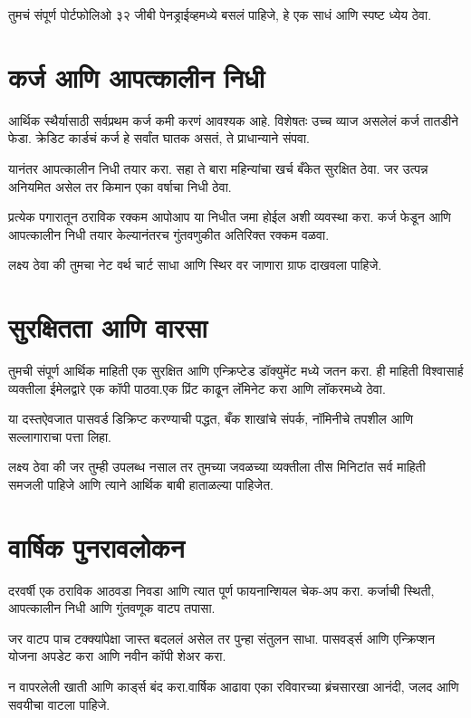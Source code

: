 तुमचं संपूर्ण पोर्टफोलिओ ३२ जीबी पेनड्राईव्हमध्ये बसलं पाहिजे, हे एक साधं आणि स्पष्ट ध्येय ठेवा.


\section*{कर्ज आणि आपत्कालीन निधी}

आर्थिक स्थैर्यासाठी सर्वप्रथम कर्ज कमी करणं आवश्यक आहे. विशेषतः उच्च व्याज असलेलं कर्ज तातडीने फेडा.
क्रेडिट कार्डचं कर्ज हे सर्वांत घातक असतं, ते प्राधान्याने संपवा.

यानंतर आपत्कालीन निधी तयार करा. सहा ते बारा महिन्यांचा खर्च बँकेत सुरक्षित ठेवा. जर उत्पन्न अनियमित असेल तर किमान एका वर्षाचा निधी ठेवा.

प्रत्येक पगारातून ठराविक रक्कम आपोआप या निधीत जमा होईल अशी व्यवस्था करा.
कर्ज फेडून आणि आपत्कालीन निधी तयार केल्यानंतरच गुंतवणुकीत अतिरिक्त रक्कम वळवा.

लक्ष्य ठेवा की तुमचा नेट वर्थ चार्ट साधा आणि स्थिर वर जाणारा ग्राफ दाखवला पाहिजे.

\section*{सुरक्षितता आणि वारसा}

तुमची संपूर्ण आर्थिक माहिती एक सुरक्षित आणि एन्क्रिप्टेड डॉक्युमेंट मध्ये जतन करा. ही माहिती विश्वासार्ह व्यक्तीला ईमेलद्वारे एक कॉपी पाठवा.एक प्रिंट काढून लॅमिनेट करा आणि लॉकरमध्ये ठेवा.

या दस्तऐवजात पासवर्ड डिक्रिप्ट करण्याची पद्धत, बँक शाखांचे संपर्क, नॉमिनीचे तपशील आणि सल्लागाराचा पत्ता लिहा.

लक्ष्य ठेवा की जर तुम्ही उपलब्ध नसाल तर तुमच्या जवळच्या व्यक्तीला तीस मिनिटांत सर्व माहिती समजली पाहिजे आणि त्याने आर्थिक बाबी हाताळल्या पाहिजेत.

\section*{वार्षिक पुनरावलोकन}

दरवर्षी एक ठराविक आठवडा निवडा आणि त्यात पूर्ण फायनान्शियल चेक-अप करा. कर्जाची स्थिती, आपत्कालीन निधी आणि गुंतवणूक वाटप तपासा.

जर वाटप पाच टक्क्यांपेक्षा जास्त बदललं असेल तर पुन्हा संतुलन साधा. पासवर्ड्स आणि एन्क्रिप्शन योजना अपडेट करा आणि नवीन कॉपी शेअर करा.

न वापरलेली खाती आणि कार्ड्स बंद करा.वार्षिक आढावा एका रविवारच्या ब्रंचसारखा आनंदी, जलद आणि सवयीचा वाटला पाहिजे.



